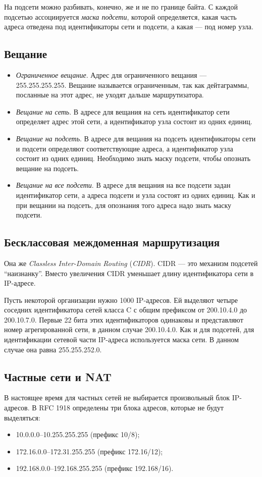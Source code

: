 На подсети можно разбивать, конечно, же и не по границе байта. С каждой подсетью ассоциируется \emph{маска подсети}, которой определяется, какая часть адреса отведена под идентификаторы сети и подсети, а какая --- под номер узла.

\subsection{Вещание}
\begin{itemize}
  \item \emph{Ограниченное вещание}. Адрес для ограниченного вещания --- 255.255.255.255. Вещание называется ограниченным, так как дейтаграммы, посланные на этот адрес, не уходят дальше маршрутизатора.
  \item \emph{Вещание на сеть}. В адресе для вещания на сеть идентификатор сети определяет адрес этой сети, а идентификатор узла состоит из одних единиц.
  \item \emph{Вещание на подсеть}. В адресе для вещания на подсеть идентификаторы сети и подсети определяют соответствующие адреса, а идентификатор узла состоит из одних единиц. Необходимо знать маску подсети, чтобы опознать вещание на подсеть.
  \item \emph{Вещание на все подсети}. В адресе для вещания на все подсети задан идентификатор сети, а адреса подсети и узла состоят из одних единиц. Как и при вещании на подсеть, для опознания того адреса надо знать маску подсети.
\end{itemize}

\subsection{Бесклассовая междоменная маршрутизация}
Она же \emph{Classless Inter-Domain Routing} (\emph{CIDR}). CIDR --- это механизм подсетей ``наизнанку''. Вместо увеличения CIDR уменьшает длину идентификатора сети в IP-адресе.

Пусть некоторой организации нужно 1000 IP-адресов. Ей выделяют четыре соседних идентификатора сетей класса C с общим префиксом от 200.10.4.0 до 200.10.7.0. Первые 22 бита этих идентификаторов одинаковы и представляют номер агрегированной сети, в данном случае 200.10.4.0. Как и для подсетей, для идентификации сетевой части IP-адреса используется маска сети. В данном случае она равна 255.255.252.0.

\subsection{Частные сети и NAT}
В настоящее время для частных сетей не выбирается произвольный блок IP-адресов. В RFC 1918 определены три блока адресов, которые не будут выделяться:
\begin{itemize}
  \item 10.0.0.0--10.255.255.255 (префикс 10/8);
  \item 172.16.0.0--172.31.255.255 (префикс 172.16/12);
  \item 192.168.0.0--192.168.255.255 (префикс 192.168/16).
\end{itemize}

